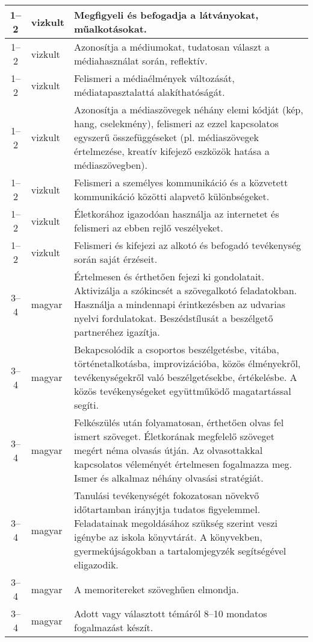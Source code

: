 \begin{small}
\begin{longtable}{c | p{2cm} |  p{11cm} }
              1--2 & vizkult & Megfigyeli és befogadja a látványokat, műalkotásokat. \\ \hline
              1--2 & vizkult & Azonosítja a médiumokat, tudatosan választ a médiahasználat során, reflektív. \\ \hline
              1--2 & vizkult & Felismeri a médiaélmények változását, médiatapasztalattá alakíthatóságát. \\ \hline
              1--2 & vizkult & Azonosítja a médiaszövegek néhány elemi kódját (kép, hang, cselekmény), felismeri az ezzel kapcsolatos egyszerű összefüggéseket (pl. médiaszövegek értelmezése, kreatív kifejező eszközök hatása a médiaszövegben). \\ \hline
              1--2 & vizkult & Felismeri a személyes kommunikáció és a közvetett kommunikáció közötti alapvető különbségeket. \\ \hline
              1--2 & vizkult & Életkorához igazodóan használja az internetet és felismeri az ebben rejlő veszélyeket. \\ \hline
              1--2 & vizkult & Felismeri és kifejezi az alkotó és befogadó tevékenység során saját érzéseit. \\ \hline
              3--4 & magyar & Értelmesen és érthetően fejezi ki gondolatait. Aktivizálja a szókincsét a szövegalkotó feladatokban. Használja a mindennapi érintkezésben az udvarias nyelvi fordulatokat. Beszédstílusát a beszélgető partneréhez igazítja. \\ \hline
              3--4 & magyar & Bekapcsolódik a csoportos beszélgetésbe, vitába, történetalkotásba, improvizációba, közös élményekről, tevékenységekről való beszélgetésekbe, értékelésbe. A közös tevékenységeket együttműködő magatartással segíti. \\ \hline
              3--4 & magyar & Felkészülés után folyamatosan, érthetően olvas fel ismert szöveget. Életkorának megfelelő szöveget megért néma olvasás útján. Az olvasottakkal kapcsolatos véleményét értelmesen fogalmazza meg. Ismer és alkalmaz néhány olvasási stratégiát. \\ \hline
              3--4 & magyar & Tanulási tevékenységét fokozatosan növekvő időtartamban irányjtja tudatos figyelemmel. Feladatainak megoldásához szükség szerint veszi igénybe az iskola könyvtárát. A könyvekben, gyermekújságokban a tartalomjegyzék segítségével eligazodik. \\ \hline
              3--4 & magyar & A memoritereket szöveghűen elmondja. \\ \hline
              3--4 & magyar & Adott vagy választott témáról 8–10 mondatos fogalmazást készít. \\ \hline

\end{longtable}
\end{small}
